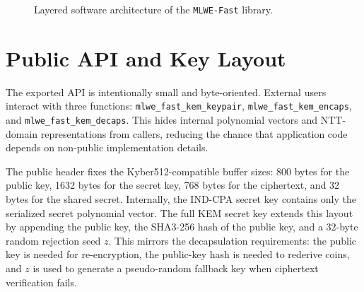 \begin{figure}[htbp]
    \centering
    \caption{Layered software architecture of the \texttt{MLWE-Fast} library. }
    \label{fig:architectural_overview}
\end{figure}

\section{Public API and Key Layout}
\label{sec:public_api_key_layout}

The exported API is intentionally small and byte-oriented. External users interact with three functions: \texttt{mlwe\_fast\_kem\_keypair}, \texttt{mlwe\_fast\_kem\_encaps}, and \texttt{mlwe\_fast\_kem\_decaps}. This hides internal polynomial vectors and NTT-domain representations from callers, reducing the chance that application code depends on non-public implementation details.

The public header fixes the Kyber512-compatible buffer sizes: 800 bytes for the public key, 1632 bytes for the secret key, 768 bytes for the ciphertext, and 32 bytes for the shared secret. Internally, the IND-CPA secret key contains only the serialized secret polynomial vector. The full KEM secret key extends this layout by appending the public key, the SHA3-256 hash of the public key, and a 32-byte random rejection seed $z$. This mirrors the decapsulation requirements: the public key is needed for re-encryption, the public-key hash is needed to rederive coins, and $z$ is used to generate a pseudo-random fallback key when ciphertext verification fails.

